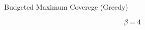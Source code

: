 \begin{frame}{Budgeted Maximum Coverege (Greedy)}
    \begin{center}
        $$
        \beta = 4
        $$
        
    \end{center}
\end{frame}
